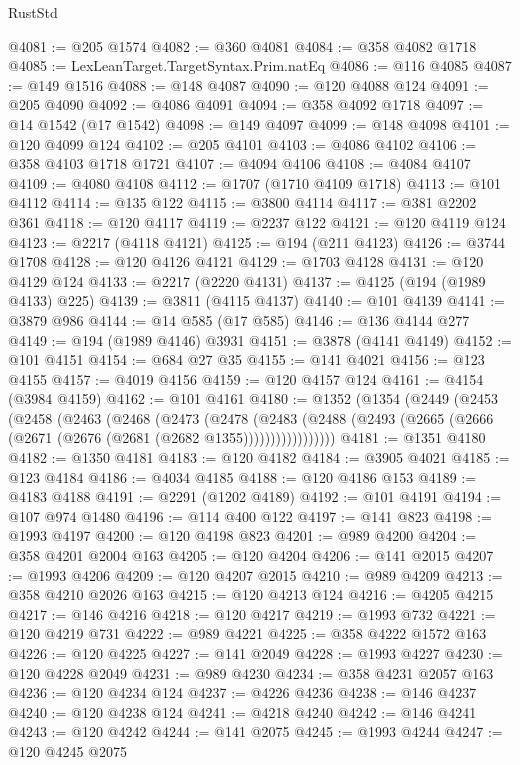 \begin{lexlean}{RustStd}
\begin{coremodule}
@4081 := @205 @1574
@4082 := @360 @4081
@4084 := @358 @4082 @1718
@4085 := LexLeanTarget.TargetSyntax.Prim.natEq
@4086 := @116 @4085
@4087 := @149 @1516
@4088 := @148 @4087
@4090 := @120 @4088 @124
@4091 := @205 @4090
@4092 := @4086 @4091
@4094 := @358 @4092 @1718
@4097 := @14 @1542 (@17 @1542)
@4098 := @149 @4097
@4099 := @148 @4098
@4101 := @120 @4099 @124
@4102 := @205 @4101
@4103 := @4086 @4102
@4106 := @358 @4103 @1718 @1721
@4107 := @4094 @4106
@4108 := @4084 @4107
@4109 := @4080 @4108
@4112 := @1707 (@1710 @4109 @1718)
@4113 := @101 @4112
@4114 := @135 @122
@4115 := @3800 @4114
@4117 := @381 @2202 @361
@4118 := @120 @4117
@4119 := @2237 @122
@4121 := @120 @4119 @124
@4123 := @2217 (@4118 @4121)
@4125 := @194 (@211 @4123)
@4126 := @3744 @1708
@4128 := @120 @4126 @4121
@4129 := @1703 @4128
@4131 := @120 @4129 @124
@4133 := @2217 (@2220 @4131)
@4137 := @4125 (@194 (@1989 @4133) @225)
@4139 := @3811 (@4115 @4137)
@4140 := @101 @4139
@4141 := @3879 @986
@4144 := @14 @585 (@17 @585)
@4146 := @136 @4144 @277
@4149 := @194 (@1989 @4146) @3931
@4151 := @3878 (@4141 @4149)
@4152 := @101 @4151
@4154 := @684 @27 @35
@4155 := @141 @4021
@4156 := @123 @4155
@4157 := @4019 @4156
@4159 := @120 @4157 @124
@4161 := @4154 (@3984 @4159)
@4162 := @101 @4161
@4180 := @1352
    (@1354
      (@2449
        (@2453
          (@2458
            (@2463
              (@2468
                (@2473
                  (@2478
                    (@2483
                      (@2488 (@2493 (@2665 (@2666 (@2671 (@2676 (@2681 (@2682 @1355)))))))))))))))))
@4181 := @1351 @4180
@4182 := @1350 @4181
@4183 := @120 @4182
@4184 := @3905 @4021
@4185 := @123 @4184
@4186 := @4034 @4185
@4188 := @120 @4186 @153
@4189 := @4183 @4188
@4191 := @2291 (@1202 @4189)
@4192 := @101 @4191
@4194 := @107 @974 @1480
@4196 := @114 @400 @122
@4197 := @141 @823
@4198 := @1993 @4197
@4200 := @120 @4198 @823
@4201 := @989 @4200
@4204 := @358 @4201 @2004 @163
@4205 := @120 @4204
@4206 := @141 @2015
@4207 := @1993 @4206
@4209 := @120 @4207 @2015
@4210 := @989 @4209
@4213 := @358 @4210 @2026 @163
@4215 := @120 @4213 @124
@4216 := @4205 @4215
@4217 := @146 @4216
@4218 := @120 @4217
@4219 := @1993 @732
@4221 := @120 @4219 @731
@4222 := @989 @4221
@4225 := @358 @4222 @1572 @163
@4226 := @120 @4225
@4227 := @141 @2049
@4228 := @1993 @4227
@4230 := @120 @4228 @2049
@4231 := @989 @4230
@4234 := @358 @4231 @2057 @163
@4236 := @120 @4234 @124
@4237 := @4226 @4236
@4238 := @146 @4237
@4240 := @120 @4238 @124
@4241 := @4218 @4240
@4242 := @146 @4241
@4243 := @120 @4242
@4244 := @141 @2075
@4245 := @1993 @4244
@4247 := @120 @4245 @2075

\end{coremodule}
\end{lexlean}
